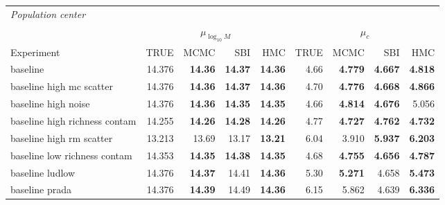 \begin{table}
{\begin{tabular}{l rrrr rrrr}
\hline
\multicolumn{9}{l}{\textit{Population center}} \\
 & \multicolumn{4}{c}{$\mu_{\log_{10}M}$} & \multicolumn{4}{c}{$\mu_c$} \\
Experiment & TRUE & MCMC & SBI & HMC & TRUE & MCMC & SBI & HMC \\
\hline
baseline & 14.376 & \textbf{14.36} & \textbf{14.37} & \textbf{14.36} & 4.66 & \textbf{4.779} & \textbf{4.667} & \textbf{4.818} \\
baseline high mc scatter & 14.376 & \textbf{14.36} & \textbf{14.37} & \textbf{14.36} & 4.70 & \textbf{4.776} & \textbf{4.668} & \textbf{4.866} \\
baseline high noise & 14.376 & \textbf{14.36} & \textbf{14.35} & \textbf{14.35} & 4.66 & \textbf{4.814} & \textbf{4.676} & 5.056 \\
baseline high richness contam & 14.255 & \textbf{14.26} & \textbf{14.28} & \textbf{14.26} & 4.77 & \textbf{4.727} & \textbf{4.762} & \textbf{4.732} \\
baseline high rm scatter & 13.213 & 13.69 & 13.17 & \textbf{13.21} & 6.04 & 3.910 & \textbf{5.937} & \textbf{6.203} \\
baseline low richness contam & 14.353 & \textbf{14.35} & \textbf{14.38} & \textbf{14.35} & 4.68 & \textbf{4.755} & \textbf{4.656} & \textbf{4.787} \\
baseline ludlow & 14.376 & \textbf{14.37} & 14.41 & \textbf{14.36} & 5.30 & \textbf{5.271} & 4.658 & \textbf{5.473} \\
baseline prada & 14.376 & \textbf{14.39} & 14.49 & \textbf{14.36} & 6.15 & 5.862 & 4.639 & \textbf{6.336} \\
\hline
\end{tabular}
}
\end{table}